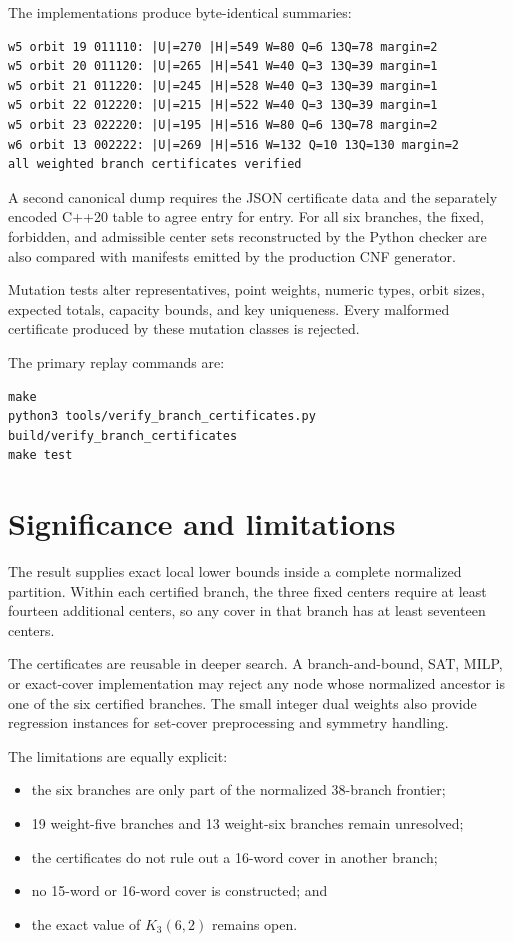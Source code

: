 \documentclass[11pt]{article}
\begin{document}
The implementations produce byte-identical summaries:

\begin{Verbatim}[fontsize=\small]
w5 orbit 19 011110: |U|=270 |H|=549 W=80 Q=6 13Q=78 margin=2
w5 orbit 20 011120: |U|=265 |H|=541 W=40 Q=3 13Q=39 margin=1
w5 orbit 21 011220: |U|=245 |H|=528 W=40 Q=3 13Q=39 margin=1
w5 orbit 22 012220: |U|=215 |H|=522 W=40 Q=3 13Q=39 margin=1
w5 orbit 23 022220: |U|=195 |H|=516 W=80 Q=6 13Q=78 margin=2
w6 orbit 13 002222: |U|=269 |H|=516 W=132 Q=10 13Q=130 margin=2
all weighted branch certificates verified
\end{Verbatim}

A second canonical dump requires the JSON certificate data and the separately
encoded C++20 table to agree entry for entry.  For all six branches, the
fixed, forbidden, and admissible center sets reconstructed by the Python
checker are also compared with manifests emitted by the production CNF
generator.

Mutation tests alter representatives, point weights, numeric types, orbit
sizes, expected totals, capacity bounds, and key uniqueness.  Every malformed
certificate produced by these mutation classes is rejected.

The primary replay commands are:

\begin{Verbatim}[fontsize=\small]
make
python3 tools/verify_branch_certificates.py
build/verify_branch_certificates
make test
\end{Verbatim}

\section{Significance and limitations}

The result supplies exact local lower bounds inside a complete normalized
partition.  Within each certified branch, the three fixed centers require at
least fourteen additional centers, so any cover in that branch has at least
seventeen centers.

The certificates are reusable in deeper search.  A branch-and-bound, SAT,
MILP, or exact-cover implementation may reject any node whose normalized
ancestor is one of the six certified branches.  The small integer dual
weights also provide regression instances for set-cover preprocessing and
symmetry handling.

The limitations are equally explicit:

\begin{itemize}[leftmargin=2em]
  \item the six branches are only part of the normalized 38-branch frontier;
  \item 19 weight-five branches and 13 weight-six branches remain unresolved;
  \item the certificates do not rule out a 16-word cover in another branch;
  \item no 15-word or 16-word cover is constructed; and
  \item the exact value of \(K_3(6,2)\) remains open.
\end{itemize}
\end{document}
